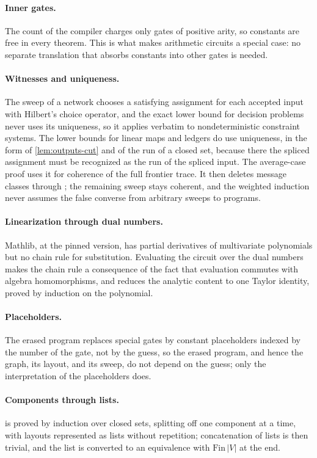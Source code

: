 \documentclass[11pt]{article}
\theoremstyle{plain}
\theoremstyle{definition}
\theoremstyle{remark}
\newcommand{\card}[1]{\lvert #1\rvert}
\begin{document}
\paragraph{Inner gates.}
The count of the compiler charges only gates of positive arity, so constants are free in every
theorem. This is what makes arithmetic circuits a special case: no separate translation that
absorbs constants into other gates is needed.

\paragraph{Witnesses and uniqueness.}
The sweep of a network chooses a satisfying assignment for each accepted input with Hilbert's
choice operator, and the exact lower bound for decision problems never uses its uniqueness, so it
applies verbatim to nondeterministic constraint systems. The lower bounds for linear maps and
ledgers do use uniqueness, in the form of \cref{lem:outputs-cut} and of the run of a closed set,
because there the spliced assignment must be recognized as the run of the spliced input.
The average-case proof uses it for coherence of the full frontier trace. It then deletes
message classes through ; the remaining sweep stays coherent, and the
weighted induction never assumes the false converse from arbitrary sweeps to programs.

\paragraph{Linearization through dual numbers.}
Mathlib, at the pinned version, has partial derivatives of multivariate polynomials but no chain
rule for substitution. Evaluating
the circuit over the dual numbers makes the chain rule a consequence of the fact that
evaluation commutes with algebra homomorphisms, and reduces the analytic content to one Taylor
identity, proved by induction on the polynomial.

\paragraph{Placeholders.}
The erased program replaces special gates by constant placeholders indexed by the number of the
gate, not by the guess, so the erased program, and hence the graph, its layout, and its sweep,
do not depend on the guess; only the interpretation of the placeholders does.

\paragraph{Components through lists.}
 is proved by induction over closed sets, splitting off one component at
a time, with layouts represented as lists without repetition; concatenation of lists is then
trivial, and the list is converted to an equivalence with $\mathrm{Fin}\,\card V$ at the end.
\end{document}

